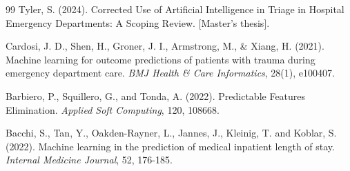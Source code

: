 \documentclass[harvard,article]{frontiersinFPHY_FAMS}
\begin{document}
\begin{thebibliography}{99}
 Tyler, S. (2024). Corrected Use of Artificial Intelligence in Triage in Hospital Emergency Departments: A Scoping Review. [Master's thesis].

 Cardosi, J. D., Shen, H., Groner, J. I., Armstrong, M., \& Xiang, H. (2021). Machine learning for outcome predictions of patients with trauma during emergency department care. \textit{BMJ Health \& Care Informatics}, 28(1), e100407.

 Barbiero, P., Squillero, G., and Tonda, A. (2022). Predictable Features Elimination. \textit{Applied Soft Computing}, 120, 108668.

 Bacchi, S., Tan, Y., Oakden-Rayner, L., Jannes, J., Kleinig, T. and Koblar, S. (2022). Machine learning in the prediction of medical inpatient length of stay. \textit{Internal Medicine Journal}, 52, 176-185.

\end{thebibliography}
\end{document}
